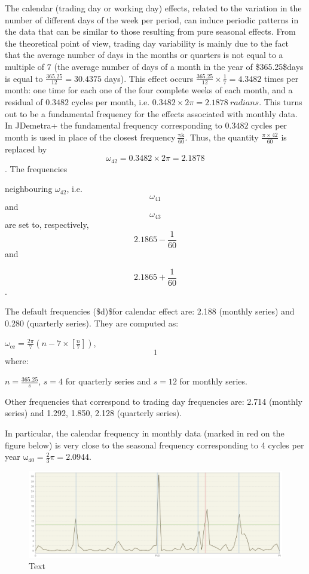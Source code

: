 \documentclass[
  letterpaper,
  DIV=11,
  numbers=noendperiod]{scrreprt}
\begin{document}
The calendar (trading day or working day) effects, related to the
variation in the number of different days of the week per period, can
induce periodic patterns in the data that can be similar to those
resulting from pure seasonal effects. From the theoretical point of
view, trading day variability is mainly due to the fact that the average
number of days in the months or quarters is not equal to a multiple of
\(7\) (the average number of days of a month in the year of
\$365.25\$days is equal to \(\frac{365.25}{12} = 30.4375\) days). This
effect occurs \(\frac{365.25}{12} \times \frac{1}{7} = 4.3482\) times
per month: one time for each one of the four complete weeks of each
month, and a residual of \(0.3482\) cycles per month, i.e.
\(0.3482 \times 2\pi = 2.1878\ radians\). This turns out to be a
fundamental frequency for the effects associated with monthly data. In
JDemetra+ the fundamental frequency corresponding to \(0.3482\) cycles
per month is used in place of the closest
frequency\(\ \frac{\text{πk}}{60}\). Thus, the quantity
\(\frac{\pi \times 42}{60}\) is replaced by
\[\omega_{42} = 0.3482 \times 2\pi = 2.1878\]. The frequencies

neighbouring \(\omega_{42}\), i.e.~\[\omega_{41}\] and \[\omega_{43}\]
are set to, respectively, \[2.1865 - \frac{1}{60}\] and

\[2.1865 + \frac{1}{60}\].

The default frequencies (\$d)\$for calendar effect are: 2.188 (monthly
series) and 0.280 (quarterly series). They are computed as:

\(\omega_{\text{ce}} = \frac{2\pi}{7}\left( n - 7 \times \left\lbrack \frac{n}{7} \right\rbrack \right)\),
\[1\] where:

\(n = \frac{365.25}{s}\), \(s = 4\) for quarterly series and \(s = 12\)
for monthly series.

Other frequencies that correspond to trading day frequencies are: 2.714
(monthly series) and 1.292, 1.850, 2.128 (quarterly series).

In particular, the calendar frequency in monthly data (marked in red on
the figure below) is very close to the seasonal frequency corresponding
to 4 cycles per year \(\text{ω}_{40} = \frac{2}{3}\pi = 2.0944\).

\begin{figure}

{\centering \includegraphics{./All_images/UG_A_image19.png}

}

\caption{Text}

\end{figure}
\end{document}
